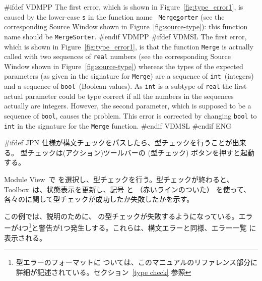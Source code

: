 \documentclass[\pformat,12pt]{article}
\newcommand{\Toolbox}{Toolbox}
\newcommand{\vdmModView}{\guicmd{Module View}}
\newcommand{\vdmModView}{\guicmd{モジュールビュー}}
\newcommand{\Toolbox}{Toolbox}
\newcommand{\vdmModView}{\guicmd{VDM View}}
\newcommand{\vdmModView}{\guicmd{VDMビュー}}
\newcommand{\guicmd}[1]{{\sf #1}}
\newcommand{\guicmd}[1]{{\gt #1}}
\begin{document}
#ifdef VDMPP
The first error, which is shown in Figure~\ref{fig:type_error1}, is
caused by the lower-case {\tt s} in the function name {\tt
  Merge\underline{s}orter} (see the corresponding \guicmd{Source Window} shown in
Figure~\ref{fig:source-type}): this function name should be {\tt MergeSorter}.
#endif VDMPP
#ifdef VDMSL 
The first error, which is shown in Figure~\ref{fig:type_error1},
is that the function {\tt Merge} is actually called with two sequences of
{\tt real} numbers (see the corresponding \guicmd{Source Window} shown in
Figure~\ref{fig:source-type}) whereas the types of the expected
parameters (as given in the signature for 
{\tt Merge}) are a sequence of {\tt int}~(integers) and a sequence of
{\tt bool}~(Boolean values). As {\tt int} is a subtype of {\tt real}
the first actual parameter could be type correct if all
the numbers in the sequences actually are integers. However, the
second parameter, which is supposed to be a sequence of {\tt bool},
causes the problem.  This error is corrected by changing {\tt bool} to
{\tt int} in the signature for the {\tt Merge} function.
#endif VDMSL
#endif ENG

#ifdef JPN
仕様が構文チェックをパスしたら、型チェックを行うことが出来る。
型チェックは(\guicmd{アクション})ツールバーの  
(\guicmd{型チェック}) ボタンを押すと起動する。

\vdmModView\ で  
を選択し、型チェックを行う。型チェックが終わると、 \Toolbox\ は、状態表示を更新し、記号
と
（赤いラインのついた）
を使って、各々のに関して型チェックが成功したか失敗したかを示す。

この例では、説明のために、
の型チェックが失敗するようになっている。エラーが4つ\footnote{型エラーのフォーマットに
ついては、このマニュアルのリファレンス部分に詳細が記述されている。セクション~\ref{type check}
参照}と警告が1つ発生しする。これらは、構文エラーと同様、\guicmd{エラー一覧} に表示される。
\end{document}

